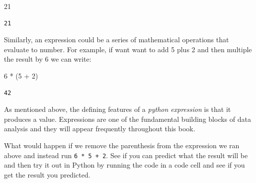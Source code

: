 \documentclass[
  letterpaper,
  DIV=11,
  numbers=noendperiod]{scrreprt}
\newenvironment{Shaded}{\begin{snugshade}}{\end{snugshade}}
\newcommand{\DecValTok}[1]{\textcolor[rgb]{0.68,0.00,0.00}{#1}}
\newcommand{\NormalTok}[1]{\textcolor[rgb]{0.00,0.23,0.31}{#1}}
\newcommand{\OperatorTok}[1]{\textcolor[rgb]{0.37,0.37,0.37}{#1}}
\begin{document}
\begin{Shaded}
\begin{Highlighting}[]
\DecValTok{21}
\end{Highlighting}
\end{Shaded}

\begin{verbatim}
21
\end{verbatim}

Similarly, an expression could be a series of mathematical operations
that evaluate to number. For example, if want want to add 5 plus 2 and
then multiple the result by 6 we can write:

\begin{Shaded}
\begin{Highlighting}[]
\DecValTok{6} \OperatorTok{*}\NormalTok{ (}\DecValTok{5} \OperatorTok{+} \DecValTok{2}\NormalTok{) }
\end{Highlighting}
\end{Shaded}

\begin{verbatim}
42
\end{verbatim}

As mentioned above, the defining features of a \emph{python expression}
is that it produces a value. Expressions are one of the fundamental
building blocks of data analysis and they will appear frequently
throughout this book.

\begin{tcolorbox}[enhanced jigsaw, colframe=quarto-callout-tip-color-frame, toprule=.15mm, left=2mm, breakable, colbacktitle=quarto-callout-tip-color!10!white, arc=.35mm, opacityback=0, colback=white, leftrule=.75mm, title=\textcolor{quarto-callout-tip-color}{\faLightbulb}\hspace{0.5em}{Exercise}, bottomrule=.15mm, bottomtitle=1mm, toptitle=1mm, titlerule=0mm, rightrule=.15mm, opacitybacktitle=0.6, coltitle=black]

What would happen if we remove the parenthesis from the expression we
ran above and instead run \texttt{6\ *\ 5\ +\ 2}. See if you can predict
what the result will be and then try it out in Python by running the
code in a code cell and see if you get the result you predicted.

\end{tcolorbox}
\end{document}
